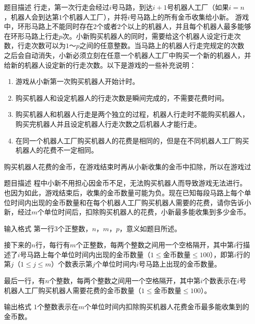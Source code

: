 \documentclass[UTF-8,aspectratio=1610]{ctexbeamer}
\begin{document}
\begin{frame}
\begin{block}{题目描述}
行走，第一次行走会经过$i$号马路，到达$i+1$号机器人工厂（如果$i=n$，机器人会到达第$1$个机器人工厂），并将$i$号马路上的所有金币收集给小新。 游戏中，环形马路上不能同时存在$2$个或者$2$个以上的机器人，并且每个机器人最多能够在环形马路上行走$p$次。小新购买机器人的同时，需要给这个机器人设定行走次数，行走次数可以为$1$～$p$之间的任意整数。当马路上的机器人行走完规定的次数之后会自动消失，小新必须立刻在任意一个机器人工厂中购买一个新的机器人，并给新的机器人设定新的行走次数。以下是游戏的一些补充说明：
\begin{enumerate}
\item{游戏从小新第一次购买机器人开始计时。}
\item{购买机器人和设定机器人的行走次数是瞬间完成的，不需要花费时间。}
\item{购买机器人和机器人行走是两个独立的过程，机器人行走时不能购买机器人，购买完机器人并且设定机器人行走次数之后机器人才能行走。}
\item{在同一个机器人工厂购买机器人的花费是相同的，但是在不同机器人工厂购买机器人的花费不一定相同。}
\end{enumerate}
购买机器人花费的金币，在游戏结束时再从小新收集的金币中扣除，所以在游戏过
\end{block}
\end{frame}
\begin{frame}
\begin{block}{题目描述}
程中小新不用担心因金币不足，无法购买机器人而导致游戏无法进行。也因为如此，游戏结束后，收集的金币数量可能为负。现在已知每段马路上每个单位时间内出现的金币数量和在每个机器人工厂购买机器人需要的花费，请你告诉小新，经过$m$个单位时间后，扣除购买机器人的花费，小新最多能收集到多少金币。
\end{block}
\begin{alertblock}{输入格式}
第一行$3$个正整数，$n，m，p$，意义如题目所述。

接下来的$n$行，每行有$m$个正整数，每两个整数之间用一个空格隔开，其中第$i$行描述了$i$号马路上每个单位时间内出现的金币数量（$1\leqslant$金币数量$\leqslant 100$），即第$i$行的第$j$（$1\leqslant j\leqslant m$）个数表示第$j$个单位时间内$i$号马路上出现的金币数量。

最后一行，有$n$个整数，每两个整数之间用一个空格隔开，其中第$i$个数表示在$i$号机器人工厂购买机器人需要花费的金币数量（$1\leqslant$金币数量$\leqslant 100$）。
\end{alertblock}
\begin{exampleblock}{输出格式}
$1$个整数表示在$m$个单位时间内扣除购买机器人花费金币最多能收集到的金币数。
\end{exampleblock}
\end{frame}
\end{document}
